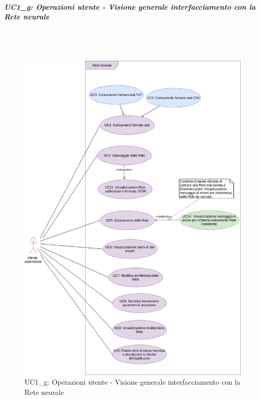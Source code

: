\subparagraph{UC1\_g: Operazioni utente - Visione generale interfacciamento con la Rete neurale}\mbox{}\\\\
\label{UC1_g: Operazioni utente - Visione generale interfacciamento con la Rete neurale}
\noindent
\begin{figure}[H]
\centering
	\includegraphics[width=0.90\linewidth]{./image/uc1_g.png}
	\caption{UC1\_g: Operazioni utente - Visione generale interfacciamento con la Rete neurale}
	\label{UC1_g: Operazioni utente - Visione generale interfacciamento con la Rete neurale}
\end{figure}
\noindent
